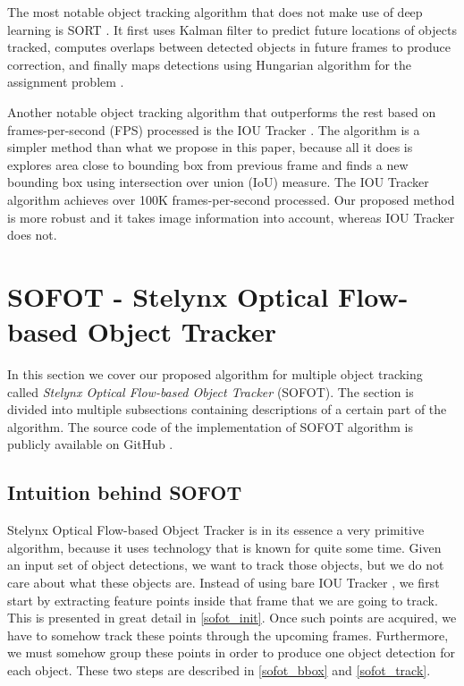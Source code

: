 \documentclass[10pt,twocolumn,letterpaper]{article}
\begin{document}
The most notable object tracking algorithm that does not make use of deep learning is SORT \cite{bewley2016simple}.
It first uses Kalman filter \cite{welch1995introduction} to predict future locations of objects tracked,
computes overlaps between detected objects in future frames to produce correction, and finally
maps detections using Hungarian algorithm for the assignment problem \cite{kuhn1955hungarian}.

Another notable object tracking algorithm that outperforms the rest based on frames-per-second (FPS) processed
is the IOU Tracker \cite{8078516}. The algorithm is a simpler method than what we propose in this
paper, because all it does is explores area close to bounding box from previous frame and finds
a new bounding box using intersection over union (IoU) measure. The IOU Tracker algorithm
achieves over 100K frames-per-second processed. Our proposed method is more robust and it takes
image information into account, whereas IOU Tracker does not.



\section{SOFOT - Stelynx Optical Flow-based Object Tracker}

In this section we cover our proposed algorithm for multiple object tracking called \emph{Stelynx Optical
Flow-based Object Tracker} (SOFOT). The section is divided into multiple subsections containing
descriptions of a certain part of the algorithm. The source code of the implementation of SOFOT
algorithm is publicly available on GitHub \cite{Stelynx_SOFOT}.

\subsection{Intuition behind SOFOT}

Stelynx Optical Flow-based Object Tracker is in its essence a very primitive algorithm, because
it uses technology that is known for quite some time. Given an input set of object detections,
we want to track those objects, but we do not care about what these objects are. Instead of using
bare IOU Tracker \cite{8078516}, we first start by extracting feature points inside that frame that
we are going to track. This is presented in great detail in \ref{sofot_init}. Once such points are
acquired, we have to somehow track these points through the upcoming frames. Furthermore, we
must somehow group these points in order to produce one object detection for each object. These two
steps are described in \ref{sofot_bbox} and \ref{sofot_track}.
\end{document}
